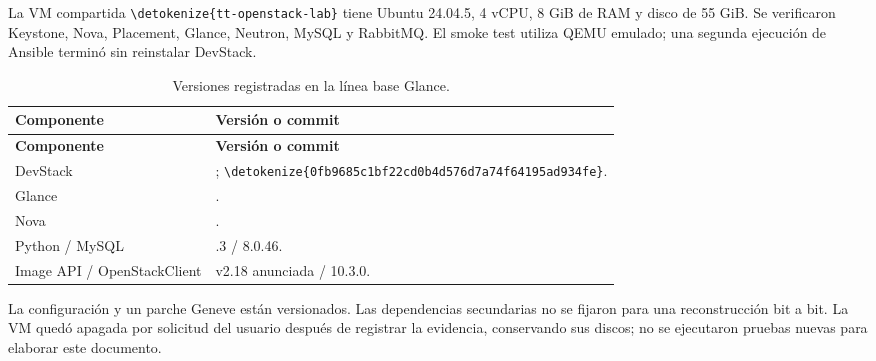 \documentclass[12pt,a4paper]{article}
\newcommand{\code}[1]{{\small\expandafter\nolinkurl\expandafter{\detokenize{#1}}}}
\newcommand{\reporttable}[4]{\begingroup\small\setlength{\LTpre}{8pt}\setlength{\LTpost}{8pt}\setlength{\tabcolsep}{4pt}\renewcommand{\arraystretch}{1.15}
\begin{longtable}{#2}\caption{#1}\\\toprule #3\\\midrule\endfirsthead
\toprule #3\\\midrule\endhead\bottomrule\endfoot #4\end{longtable}\endgroup}
\begin{document}
La VM compartida \code{tt-openstack-lab} tiene Ubuntu 24.04.5, 4 vCPU, 8 GiB de RAM y disco de 55 GiB. Se verificaron Keystone, Nova, Placement, Glance, Neutron, MySQL y RabbitMQ. El smoke test utiliza QEMU emulado; una segunda ejecución de Ansible terminó sin reinstalar DevStack.
\reporttable{Versiones registradas en la línea base Glance.}{>{\raggedright\arraybackslash}p{4cm}>{\raggedright\arraybackslash}p{11cm}}{\textbf{Componente}&\textbf{Versión o commit}}{
DevStack&\code{stable/2026.2}; \code{0fb9685c1bf22cd0b4d576d7a74f64195ad934fe}.\\*
Glance&\code{a3e5f490b7a28b1161714c94acffe5308d24b567}.\\*
Nova&\code{247ea5d774305b688997f8df81c011b249eb793c}.\\*
Python / MySQL&3.12.3 / 8.0.46.\\*
Image API / OpenStackClient&v2.18 anunciada / 10.3.0.\\}
La configuración y un parche Geneve están versionados. Las dependencias secundarias no se fijaron para una reconstrucción bit a bit. La VM quedó apagada por solicitud del usuario después de registrar la evidencia, conservando sus discos; no se ejecutaron pruebas nuevas para elaborar este documento.
\end{document}

